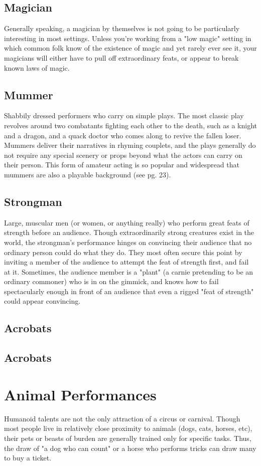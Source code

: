 \documentclass[10pt,a4paper,twoside,bg=print,twocolumn,openany,nodeprecatedcode]{dndbook}
\begin{document}
\subsection{Magician}
Generally speaking, a magician by themselves is not going to be particularly interesting in most settings. Unless you're working from a "low magic" setting in which common folk know of the existence of magic and yet rarely ever see it, your magicians will either have to pull off extraordinary feats, or appear to break known laws of magic.
\subsection{Mummer}
Shabbily dressed performers who carry on simple plays. The most classic play revolves around two combatants fighting each other to the death, such as a knight and a dragon, and a quack doctor who comes along to revive the fallen loser. Mummers deliver their narratives in rhyming couplets, and the plays generally do not require any special scenery or props beyond what the actors can carry on their person. This form of amateur acting is so popular and widespread that mummers are also a playable background (see pg. 23).
\subsection{Strongman}
Large, muscular men (or women, or anything really) who perform great feats of strength before an audience. Though extraordinarily strong creatures exist in the world, the strongman's performance hinges on convincing their audience that no ordinary person could do what they do. They most often secure this point by inviting a member of the audience to attempt the feat of strength first, and fail at it. Sometimes, the audience member is a "plant" (a carnie pretending to be an ordinary commoner) who is in on the gimmick, and knows how to fail spectacularly enough in front of an audience that even a rigged "feat of strength" could appear convincing.
\subsection{Acrobats}

\subsection{Acrobats}

\section{Animal Performances}
Humanoid talents are not the only attraction of a circus or carnival. Though most people live in relatively close proximity to animals (dogs, cats, horses, etc), their pets or beasts of burden are generally trained only for specific tasks. Thus, the draw of "a dog who can count" or a horse who performs tricks can draw many to buy a ticket.
\end{document}
